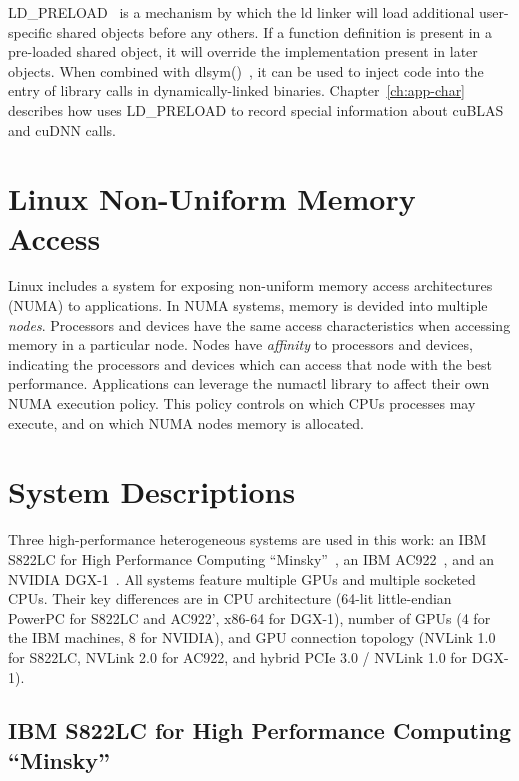 LD\_PRELOAD~\cite{kerrisk2017ld} is a mechanism by which the ld linker will load additional user-specific shared objects before any others.
If a function definition is present in a pre-loaded shared object, it will override the implementation present in later objects.
When combined with dlsym()~\cite{kerrisk2017dlysm}, it can be used to inject code into the entry of library calls in dynamically-linked binaries.
Chapter~\ref{ch:app-char} describes how  uses LD\_PRELOAD to record special information about cuBLAS and cuDNN calls.

\section{Linux Non-Uniform Memory Access}
\label{sec:numa}

Linux includes a system for exposing non-uniform memory access architectures (NUMA) to applications.
In NUMA systems, memory is devided into multiple \textit{nodes}\cite{numa2012}.
Processors and devices have the same access characteristics when accessing memory in a particular node.
Nodes have \textit{affinity} to processors and devices, indicating the processors and devices which can access that node with the best performance.
Applications can leverage the numactl\cite{wickman2015numactl} library to affect their own NUMA execution policy.
This policy controls on which CPUs processes may execute, and on which NUMA nodes memory is allocated.

\section{System Descriptions}
\label{ref:system-description}

Three high-performance heterogeneous systems are used in this work: an IBM S822LC for High Performance Computing ``Minsky''~\cite{caldeira2016s822lc}, an IBM AC922~\cite{caldeira2018ac922}, and an NVIDIA DGX-1~\cite{nvidia2016dgx1}.
All systems feature multiple GPUs and multiple socketed CPUs.
Their key differences are in CPU architecture (64-lit little-endian PowerPC for S822LC and AC922', x86-64 for DGX-1), number of GPUs (4 for the IBM machines, 8 for NVIDIA), and GPU connection topology (NVLink 1.0 for S822LC, NVLink 2.0 for AC922, and hybrid PCIe 3.0 / NVLink 1.0 for DGX-1).

\subsection{IBM S822LC for High Performance Computing ``Minsky''}
\label{sec:minsky-description}


